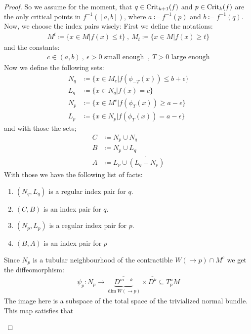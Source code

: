 \begin{proof}
So we assume for the moment, that $q\in \mathrm{Crit}_{k+1}(f)$ and $p\in \mathrm{Crit}_k(f)$ are the only critical points in $f^{-1}([a,b])$, where $a\coloneq f^{-1}(p)$ and $b\coloneq f^{-1}(q)$.
Now, we choose the index pairs wisely:
First we define the notations:
\begin{align*}
	M^t\coloneq \{x\in M| f(x)\leq t\}~,~ M_t\coloneq \{x\in M| f(x)\geq t\}
\end{align*}
and the constants:
\begin{align*}
	c\in (a,b)~,~ \epsilon>0 \text{ small enough }~,~ T>0 \text{ large enough}
\end{align*}
Now we define the following sets:
\begin{align*}
	N_q  & \coloneq    \{ x\in M_c |f(\phi_{-T}(x))  \leq b+ \epsilon  \}    \\
	L_q  & \coloneq    \{ x\in N_q |f(x)             =    c            \}    \\
	N_p  & \coloneq    \{ x\in M^c |f(\phi_T(x))     \geq a-\epsilon   \}    \\
	L_p  & \coloneq    \{ x\in N_p |f( \phi_T(x))    =    a-\epsilon   \}
\end{align*}
and with those the sets;
\begin{align*}
	C  & \coloneq  N_p \cup N_q                      \\
	B  & \coloneq  N_p \cup L_q                      \\
	A  & \coloneq  L_p \cup \mathring{(L_q-N_p)}
\end{align*}
With those we have the following list of facts:
\begin{enumerate}
	\item $(N_q,L_q)$ is a regular index pair for $q$.
	\item $(C,B)$ is an index pair for $q$.
	\item $(N_p,L_p)$ is a regular index pair for $p$.
	\item $(B,A)$ is an index pair for $p$
\end{enumerate}
 Since $N_p$ is a tubular neighbourhood of the contractible $W(\to p)\cap M^c$ we get the diffeomorphism: 
\begin{align*}
	\psi_p:N_p\to \underbrace{ \overline{D^{m-k}} }_{\dim W(\to p)} \times \overline{D^k}\subseteq T^u_pM
\end{align*} The image here is a subspace of the total space of the trivialized normal bundle. This map satisfies that
\begin{enumerate}

\end{enumerate}
\end{proof}
